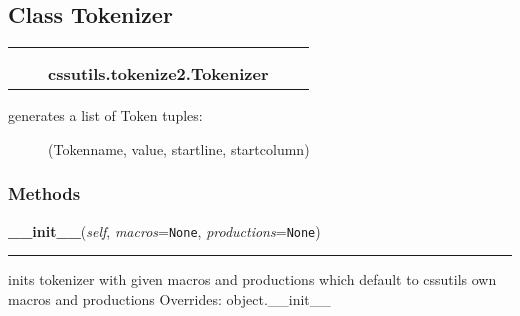 

\subsection{Class Tokenizer}

    \label{cssutils:tokenize2:Tokenizer}
\begin{tabular}{cccccc}
\multicolumn{2}{r}{\settowidth{\BCL}{object}\multirow{2}{\BCL}{object}}
&&
  \\\cline{3-3}
  &&\multicolumn{1}{c|}{}
&&
  \\
&&\multicolumn{2}{l}{\textbf{cssutils.tokenize2.Tokenizer}}
\end{tabular}

\begin{description}
\item[{generates a list of Token tuples:}] \leavevmode 
(Tokenname, value, startline, startcolumn)

\end{description}


  \subsubsection{Methods}

    \vspace{0.5ex}

\hspace{.8\funcindent}\begin{boxedminipage}{\funcwidth}

    \raggedright \textbf{\_\_init\_\_}(\textit{self}, \textit{macros}={\tt None}, \textit{productions}={\tt None})

    \vspace{-1.5ex}

    \rule{\textwidth}{0.5\fboxrule}
\setlength{\parskip}{2ex}

inits tokenizer with given macros and productions which default to
cssutils own macros and productions
\setlength{\parskip}{1ex}
      Overrides: object.\_\_init\_\_

    \end{boxedminipage}

